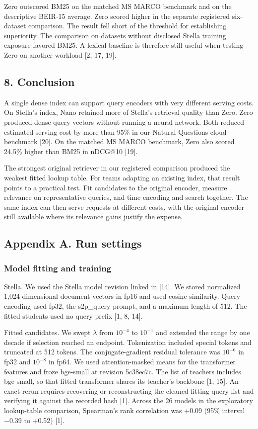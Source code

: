 \documentclass[
  english,
  10pt,
]{article}
\begin{document}
Zero outscored BM25 on the matched MS MARCO benchmark and on the
descriptive BEIR-15 average. Zero scored higher in the separate
registered six-dataset comparison. The result fell short of the
threshold for establishing superiority. The comparison on datasets
without disclosed Stella training exposure favored BM25. A lexical
baseline is therefore still useful when testing Zero on another workload
{[}2, 17, 19{]}.

\subsection{8. Conclusion}\label{conclusion}

A single dense index can support query encoders with very different
serving costs. On Stella's index, Nano retained more of Stella's
retrieval quality than Zero. Zero produced dense query vectors without
running a neural network. Both reduced estimated serving cost by more
than 95\% in our Natural Questions cloud benchmark {[}20{]}. On the
matched MS MARCO benchmark, Zero also scored 24.5\% higher than BM25 in
nDCG@10 {[}19{]}.

The strongest original retriever in our registered comparison produced
the weakest fitted lookup table. For teams adapting an existing index,
that result points to a practical test. Fit candidates to the original
encoder, measure relevance on representative queries, and time encoding
and search together. The same index can then serve requests at different
costs, with the original encoder still available where its relevance
gains justify the expense.

\subsection{Appendix A. Run settings}\label{appendix-a.-run-settings}

\subsubsection{Model fitting and
training}\label{model-fitting-and-training}

Stella. We used the Stella model revision linked in {[}14{]}. We stored
normalized 1,024-dimensional document vectors in fp16 and used cosine
similarity. Query encoding used fp32, the s2p\_query prompt, and a
maximum length of 512. The fitted students used no query prefix {[}1, 8,
14{]}.

Fitted candidates. We swept \(\lambda\) from \(10^{-4}\) to \(10^{-1}\)
and extended the range by one decade if selection reached an endpoint.
Tokenization included special tokens and truncated at 512 tokens. The
conjugate-gradient residual tolerance was \(10^{-6}\) in fp32 and
\(10^{-8}\) in fp64. We used attention-masked means for the transformer
features and froze bge-small at revision 5c38ec7c. The list of teachers
includes bge-small, so that fitted transformer shares its teacher's
backbone {[}1, 15{]}. An exact rerun requires recovering or
reconstructing the cleaned fitting-query list and verifying it against
the recorded hash {[}1{]}. Across the 26 models in the exploratory
lookup-table comparison, Spearman's rank correlation was +0.09 (95\%
interval −0.39 to +0.52) {[}1{]}.
\end{document}
